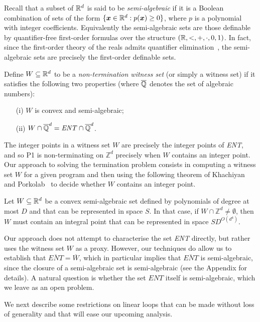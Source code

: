 Recall that a subset of $\mathbb{R}^d$ is said to be
\emph{semi-algebraic} if it is a Boolean combination of sets of the
form $\{ \boldsymbol{x} \in \mathbb{R}^d : p(\boldsymbol{x})\geq 0\}$,
where $p$ is a polynomial with integer coefficients.  Equivalently the
semi-algebraic sets are those definable by quantifier-free first-order
formulas over the structure $(\mathbb{R},<,+,\cdot,0,1)$.  In fact,
since the first-order theory of the reals admits quantifier
elimination~\cite{Tar51}, the semi-algebraic sets are precisely the
first-order definable sets.

Define $W \subseteq \mathbb{R}^d$ to be a
\emph{non-termination witness set} (or simply a witness set) if it
satisfies the following two properties (where $\overline{\mathbb{Q}}$ denotes the
set of algebraic numbers):
\begin{itemize}
\item[(i)] $W$ is convex and semi-algebraic;
\item[(ii)] $W\cap \overline{\mathbb{Q}}^d=\mathit{ENT}\cap \overline{\mathbb{Q}}^d$.
\end{itemize}

The integer points in a witness set $W$ are precisely the integer
points of \textit{ENT}, and so \textsf{P1} is non-terminating on
$\mathbb{Z}^d$ precisely when $W$ contains an integer point.  Our
approach to solving the termination problem consists in computing a
witness set $W$ for a given program and then using the following
theorem of Khachiyan and Porkolab~\cite{KhachiyanP97} to decide whether $W$
contains an integer point.
\begin{theorem}
Let $W\subseteq\mathbb{R}^d$ be a convex semi-algebraic set defined by
polynomials of degree at most $D$ and that can be represented in space
$S$. In that case, if $W\cap\mathbb{Z}^d\neq\emptyset$, then $W$ must
contain an integral point that can be represented in space
$SD^{O(d^4)}$.
\end{theorem}

Our approach does not attempt to characterise the set \textit{ENT}
directly, but rather uses the witness set $W$ as a proxy. However, our
techniques do allow us to establish that
$\overline{\mathit{ENT}}=\overline{W}$, which in particular implies
that $\overline{\mathit{ENT}}$ is semi-algebraic, since the closure of
a semi-algebraic set is semi-algebraic (see the Appendix for
details). A natural question is whether the set $ENT$
itself is semi-algebraic, which we leave as an open problem.

We next describe some restrictions on linear loops that can
be made without loss of generality and that will ease our upcoming
analysis.

